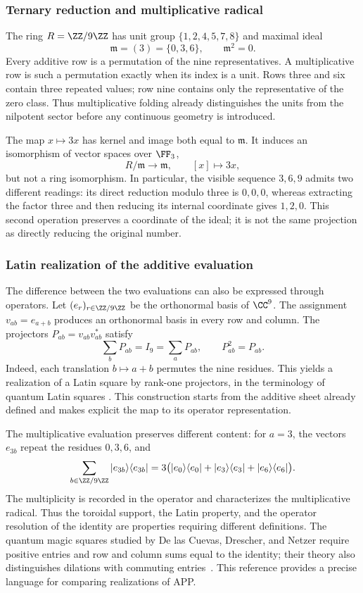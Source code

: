 \subsubsection{Ternary reduction and multiplicative radical}

The ring \(R=\ZZ/9\ZZ\) has unit group \(\{1,2,4,5,7,8\}\) and maximal ideal
\[
 \mathfrak m=(3)=\{0,3,6\},\qquad\mathfrak m^2=0.
\]
Every additive row is a permutation of the nine representatives. A multiplicative row is such a permutation exactly when its index is a unit. Rows three and six contain three repeated values; row nine contains only the representative of the zero class. Thus multiplicative folding already distinguishes the units from the nilpotent sector before any continuous geometry is introduced.

The map \(x\mapsto3x\) has kernel and image both equal to \(\mathfrak m\). It induces an isomorphism of vector spaces over \(\FF_3\),
\[
 R/\mathfrak m\longrightarrow\mathfrak m,\qquad [x]\longmapsto3x,
\]
but not a ring isomorphism. In particular, the visible sequence \(3,6,9\) admits two different readings: its direct reduction modulo three is \(0,0,0\), whereas extracting the factor three and then reducing its internal coordinate gives \(1,2,0\). This second operation preserves a coordinate of the ideal; it is not the same projection as directly reducing the original number.

\subsubsection{Latin realization of the additive evaluation}

The difference between the two evaluations can also be expressed through
operators. Let \((e_r)_{r\in\ZZ/9\ZZ}\) be the orthonormal basis of \(\CC^9\).
The assignment \(v_{ab}=e_{a+b}\) produces an orthonormal basis in every row
and column. The projectors \(P_{ab}=v_{ab}v_{ab}^{*}\) satisfy
\[
 \sum_bP_{ab}=I_9=\sum_aP_{ab},\qquad P_{ab}^2=P_{ab}.
\]
Indeed, each translation \(b\mapsto a+b\) permutes the nine residues.
This yields a realization of a Latin square by rank-one projectors,
in the terminology of quantum Latin squares
\cite{mustovicary,delascuevas2023}. This construction starts from the
additive sheet already defined and makes explicit the map to its operator representation.

The multiplicative evaluation preserves different content: for \(a=3\), the
vectors \(e_{3b}\) repeat the residues \(0,3,6\), and
\[
 \sum_{b\in\ZZ/9\ZZ}|e_{3b}\rangle\langle e_{3b}|
 =3\bigl(|e_0\rangle\langle e_0|+|e_3\rangle\langle e_3|
                    +|e_6\rangle\langle e_6|\bigr).
\]
The multiplicity is recorded in the operator and characterizes the multiplicative
radical. Thus the toroidal support, the Latin property, and the operator
resolution of the identity are properties requiring different definitions.
The quantum magic squares studied by De las Cuevas, Drescher, and Netzer
require positive entries and row and column sums equal to the identity;
their theory also distinguishes dilations with commuting entries~\cite{delascuevas2020}.
This reference provides a precise language for comparing realizations of APP.

